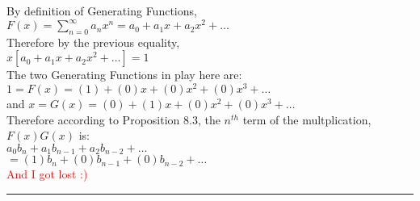 \documentclass{article}
\begin{document}
{    By definition of Generating Functions,\\

    $
    F(x) = \sum_{n=0}^{\infty}{a_nx^n}
    = a_0 + a_1x + a_2x^2 + \dots
    $\\

    Therefore by the previous equality,\\

    $
    x \left[ a_0 + a_1x + a_2x^2 + \dots \right] = 1
    $\\

    The two Generating Functions in play here are:\\

    $
    1 = F(x) = (1) + (0)x + (0)x^2 + (0)x^3 + \dots
    $\\

    and
    $
    x = G(x) = (0) + (1)x + (0)x^2 + (0)x^3 + \dots
    $\\

    Therefore according to Proposition $8.3$, the $n^{th}$
    term of the multplication, $ F(x)G(x) $ is:\\

    $
    a_0b_n + a_1b_{n-1} + a_2b_{n-2} + \dots
    $\\

    $
    = (1)b_n + (0)b_{n-1} + (0)b_{n-2} + \dots
    $\\

    \textcolor{red}{And I got lost :)}\\

    \noindent\rule{11cm}{0.4pt}\\

    }
\end{document}

